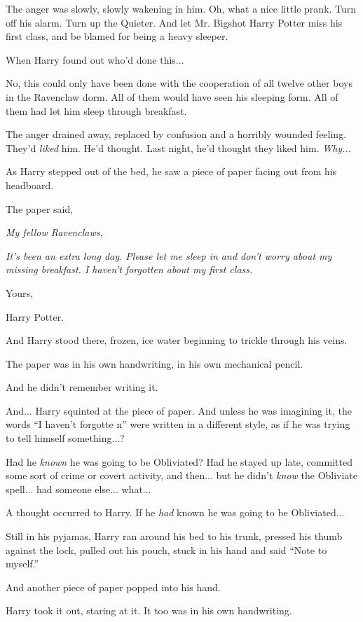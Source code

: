 The anger was slowly, slowly wakening in him. Oh, what a nice little prank. Turn off his alarm. Turn up the Quieter. And let Mr. Bigshot Harry Potter miss his first class, and be blamed for being a heavy sleeper.

When Harry found out who'd done this...

No, this could only have been done with the cooperation of all twelve other boys in the Ravenclaw dorm. All of them would have seen his sleeping form. All of them had let him sleep through breakfast.

The anger drained away, replaced by confusion and a horribly wounded feeling. They'd \emph{liked} him. He'd thought. Last night, he'd thought they liked him. \emph{Why...}

As Harry stepped out of the bed, he saw a piece of paper facing out from his headboard.

The paper said,

\emph{My fellow Ravenclaws,}

\emph{It's been an extra long day. Please let me sleep in and don't worry about my missing breakfast. I haven't forgotten about my first class.}

Yours,

Harry Potter.

And Harry stood there, frozen, ice water beginning to trickle through his veins.

The paper was in his own handwriting, in his own mechanical pencil.

And he didn't remember writing it.

And... Harry squinted at the piece of paper. And unless he was imagining it, the words ``I haven't forgotte n'' were written in a different style, as if he was trying to tell himself something...?

Had he \emph{known} he was going to be Obliviated? Had he stayed up late, committed some sort of crime or covert activity, and then... but he didn't \emph{know} the Obliviate spell... had someone else... what...

A thought occurred to Harry. If he \emph{had} known he was going to be Obliviated...

Still in his pyjamas, Harry ran around his bed to his trunk, pressed his thumb against the lock, pulled out his pouch, stuck in his hand and said ``Note to myself.''

And another piece of paper popped into his hand.

Harry took it out, staring at it. It too was in his own handwriting.

